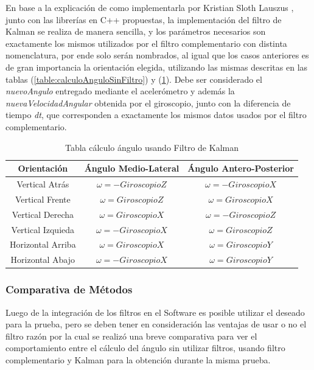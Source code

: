 \documentclass[12pt,a4paper]{article}
\begin{document}
En base a la explicación de como implementarla por Kristian Sloth Lauszus
\cite{kalmanTKJ}, junto con las librerías en C++ propuestas, la implementación del filtro de Kalman se realiza de manera sencilla, y los parámetros necesarios son exactamente los mismos utilizados por el filtro complementario con distinta nomenclatura, por ende solo serán nombrados, al igual que los casos anteriores es de gran importancia la orientación elegida, utilizando las mismas descritas en las tablas (\ref{table:calculoAnguloSinFiltro}) y (\ref{table:calculoAnguloFiltroKalman}).
Debe ser considerado el \textit{nuevoAngulo} entregado mediante el acelerómetro y además la \textit{nuevaVelocidadAngular} obtenida por el giroscopio, junto con la diferencia de tiempo \textit{dt}, que corresponden a exactamente los mismos datos usados por el filtro complementario.
\begin{table}[H]
	\centering
	\begin{tabular}{|c|c|c|}
		\hline 
		\textbf{Orientación} & \textbf{Ángulo Medio-Lateral} & \textbf{Ángulo Antero-Posterior} \\ 
		\hline 
		Vertical Atrás & $\omega= -GiroscopioZ$ &  $\omega= -GiroscopioX$ \\ 
		\hline 
		Vertical Frente & $\omega= GiroscopioZ$ &  $\omega= GiroscopioX$ \\
		\hline 
		Vertical Derecha & $\omega= GiroscopioX$ &  $\omega= -GiroscopioZ$ \\ 
		\hline 
		Vertical Izquieda & $\omega= -GiroscopioX$ &  $\omega= GiroscopioZ$ \\ 
		\hline 
		Horizontal Arriba & $\omega= GiroscopioX$ &  $\omega= GiroscopioY$ \\ 
		\hline 
		Horizontal Abajo & $\omega= -GiroscopioX$ &  $\omega= GiroscopioY$ \\ 
		\hline 
	\end{tabular}
	\caption{Tabla cálculo ángulo usando Filtro de Kalman} 
	\label{table:calculoAnguloFiltroKalman}
\end{table}

\subsubsection{Comparativa de Métodos}
Luego de la integración de los filtros en el Software es posible utilizar el deseado para la prueba, pero se deben tener en consideración las ventajas de usar o no el filtro razón por la cual se realizó una breve comparativa para ver el comportamiento entre el cálculo del ángulo sin utilizar filtros, usando filtro complementario y Kalman para la obtención durante la misma prueba.
\end{document}
